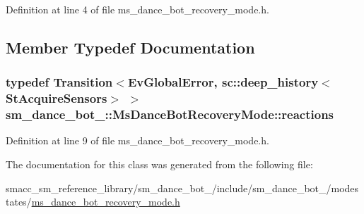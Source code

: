 Definition at line 4 of file ms\+\_\+dance\+\_\+bot\+\_\+recovery\+\_\+mode.\+h.



\subsection{Member Typedef Documentation}
\subsubsection[{\texorpdfstring{reactions}{reactions}}]{\setlength{\rightskip}{0pt plus 5cm}typedef Transition$<${\bf Ev\+Global\+Error}, sc\+::deep\+\_\+history$<${\bf St\+Acquire\+Sensors}$>$ $>$ {\bf sm\+\_\+dance\+\_\+bot\+\_\+::\+Ms\+Dance\+Bot\+Recovery\+Mode\+::reactions}}\hypertarget{classsm__dance__bot__3_1_1MsDanceBotRecoveryMode_ab3ad0a27ba2ecead1caaf7d0c802d495}{}\label{classsm__dance__bot__3_1_1MsDanceBotRecoveryMode_ab3ad0a27ba2ecead1caaf7d0c802d495}


Definition at line 9 of file ms\+\_\+dance\+\_\+bot\+\_\+recovery\+\_\+mode.\+h.



The documentation for this class was generated from the following file\+:\begin{DoxyCompactItemize}
\item 
smacc\+\_\+sm\+\_\+reference\+\_\+library/sm\+\_\+dance\+\_\+bot\+\_/include/sm\+\_\+dance\+\_\+bot\+\_/modestates/\hyperlink{3_2include_2sm__dance__bot__3_2modestates_2ms__dance__bot__recovery__mode_8h}{ms\+\_\+dance\+\_\+bot\+\_\+recovery\+\_\+mode.\+h}\end{DoxyCompactItemize}
